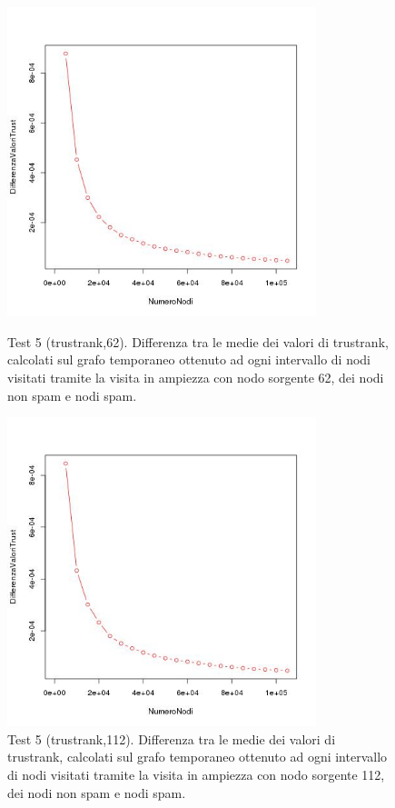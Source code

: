  
\begin{figure}
 \centering
 \includegraphics[height=9cm]{immagini/test5/averageTest_trust_62}
  \caption{Test 5 (trustrank,62). Differenza tra le medie dei valori di trustrank, calcolati sul grafo temporaneo ottenuto ad ogni intervallo di nodi visitati tramite la visita in ampiezza con nodo sorgente 62, dei nodi non spam e nodi spam.}
 \label{fig:test5trust62}
  \centering
 \includegraphics[height=9cm]{immagini/test5/averageTest_trust_112}
  \caption{Test 5 (trustrank,112). Differenza tra le medie dei valori di trustrank, calcolati sul grafo temporaneo ottenuto ad ogni intervallo di nodi visitati tramite la visita in ampiezza con nodo sorgente 112, dei nodi non spam e nodi spam.}
 \label{fig:test5trust112}
\end{figure}

